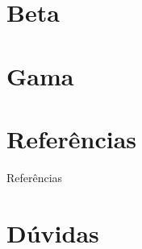 \documentclass[%
    english,
    brazil]{ifsp-spo-beamer}
\begin{document}
\section{Beta}

\section{Gama}

\section{Referências}

\begin{frame}[allowframebreaks]{Referências}

\end{frame}

\section*{Dúvidas}
\end{document}

